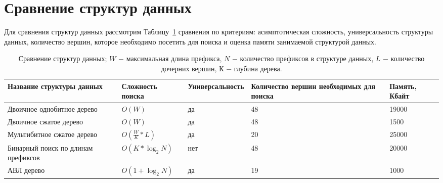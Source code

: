 \documentclass[a4paper, 12pt, titlepage, finall]{extreport}
\begin{document}
    \section{Сравнение структур данных}
        Для сравнения структур данных рассмотрим Таблицу~\ref{tab:tab1} сравнения по критериям: асимптотическая сложность, универсальность структуры данных,
        количество вершин, которое необходимо посетить для поиска и оценка памяти занимаемой структурой данных. 
        
        \begin{table}[ht]
            \caption{Сравнение структур данных; $W$ $-$ максимальная длина префикса, $N$ $-$ количество префиксов в структуре данных,
            $L$ $-$ количество дочерних вершин, $К$ $-$ глубина дерева.}\label{tab:tab1}
            \begin{tabular}{|m{3cm}|m{2.5cm}|m{3.5cm}|m{4cm}|m{3.2cm}|}
                \hline
                \bf Название структуры данных     & \bf Сложность поиска & \bf Универсальность & \bf Количество вершин необходимых для поиска & \bf Память, Кбайт \\
                \hline
                Двоичное однобитное дерево & $O(W)$ & да & 48 & 19000 \\
                \hline
                Двоичное сжатое дерево & $O(W)$ & да & 48 & 1500 \\
                \hline
                Мультибитное сжатое дерево & $O(\frac{W}{K}*L)$ & да & 20 & 25000 \\
                \hline
                Бинарный поиск по длинам префиксов & $O(K*\log_2{N})$ & нет & 48 & 20000 \\
                \hline
                АВЛ дерево & $O(1 + \log_2{N})$ & да & 19 & 1000 \\
                \hline
            \end{tabular}
        \end{table}
        
\end{document}
